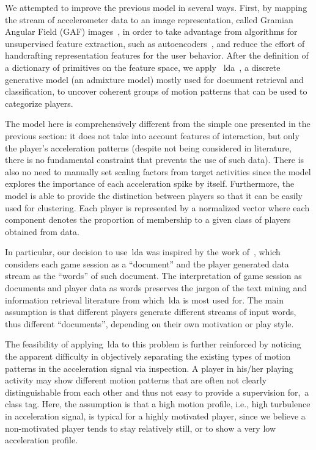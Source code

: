 We attempted to improve the previous model in several ways. First, by mapping the stream of accelerometer data to an image representation, called Gramian Angular Field (GAF) images~\citep{wang_imaging_2015}, in order to take advantage from algorithms for unsupervised feature extraction, such as autoencoders~\citep{goodfellow_deep_2016}, and reduce the effort of handcrafting representation features for the user behavior. After the definition of a dictionary of primitives on the feature space, we apply ~\gls{lda}~\citep{blei_latent_2003}, a discrete generative model (an admixture model) mostly used for document retrieval and classification, to uncover coherent groups of motion patterns that can be used to categorize players.

The model here is comprehensively different from the simple one presented in the previous section: it does not take into account features of interaction, but only the player's acceleration patterns (despite not being considered in literature, there is no fundamental constraint that prevents the use of such data). There is also no need to manually set scaling factors from target activities since the model explores the importance of each acceleration spike by itself. Furthermore, the model is able to provide the distinction between players so that it can be easily used for clustering. Each player is represented by a normalized vector where each component denotes the proportion of membership to a given class of players obtained from data.

In particular, our decision to use~\gls{lda} was inspired by the work of~\cite{smith_mining_2016}, which considers each game session as a ``document'' and the player generated data stream as the ``words'' of such document. The interpretation of game session as documents and player data as words preserves the jargon of the text mining and information retrieval literature from which~\gls{lda} is most used for. The main assumption is that different players generate different streams of input words, thus different ``documents'', depending on their own motivation or play style. 

The feasibility of applying~\gls{lda} to this problem is further reinforced by noticing the apparent difficulty in objectively separating the existing types of motion patterns in the acceleration signal via inspection. A player in his/her playing activity may show different motion patterns that are often not clearly distinguishable from each other and thus not easy to provide a supervision for,~\ie a class tag. Here, the assumption is that a high motion profile, i.e., high turbulence in acceleration signal, is typical for a highly motivated player, since we believe a non-motivated player tends to stay relatively still, or to show a very low acceleration profile.

